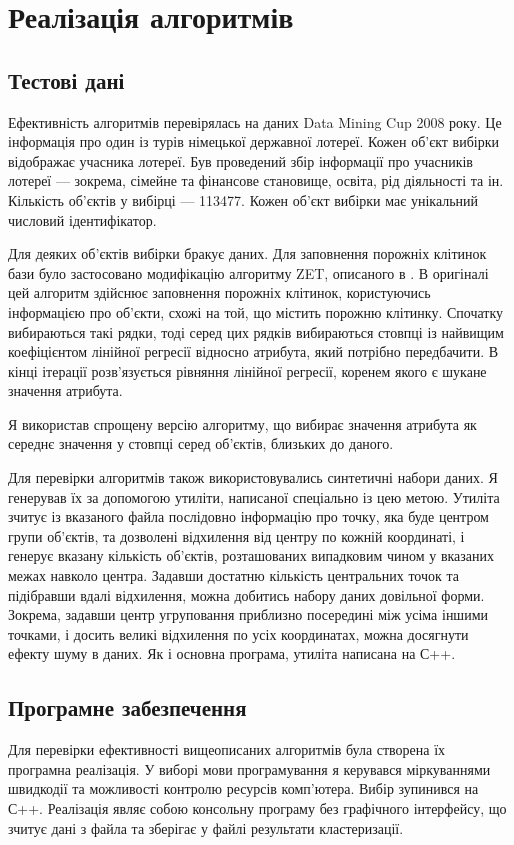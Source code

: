 \chapter{Реалізація алгоритмів}             
            
    \section {Тестові дані}
            Ефективність алгоритмів перевірялась на даних Data Mining Cup 2008 року. Це інформація про один із турів німецької державної лотереї. Кожен об'єкт вибірки відображає учасника лотереї. Був проведений збір інформації про учасників лотереї --- зокрема, сімейне та фінансове становище, освіта, рід діяльності та ін. Кількість об'єктів у вибірці --- 113477. Кожен об'єкт вибірки має унікальний числовий ідентифікатор.
            
            Для деяких об'єктів вибірки бракує даних. Для заповнення порожніх клітинок бази було застосовано модифікацію алгоритму ZET, описаного в \cite{Zagorujko}. В оригіналі цей алгоритм здійснює заповнення порожніх клітинок, користуючись інформацією про об'єкти, схожі на той, що містить порожню клітинку. Спочатку вибираються такі рядки, тоді серед цих рядків вибираються стовпці із найвищим коефіцієнтом лінійної регресії відносно атрибута, який потрібно передбачити. В кінці ітерації розв'язується рівняння лінійної регресії, коренем якого є шукане значення атрибута.
            
            Я використав спрощену версію алгоритму, що вибирає значення атрибута як середнє значення у стовпці серед об'єктів, близьких до даного.
            
            Для перевірки алгоритмів також використовувались синтетичні набори даних. Я генерував їх за допомогою утиліти, написаної спеціально із цею метою. Утиліта зчитує із вказаного файла послідовно інформацію про точку, яка буде центром групи об'єктів, та дозволені відхилення від центру по кожній координаті, і генерує вказану кількість об'єктів, розташованих випадковим чином у вказаних межах навколо центра. Задавши достатню кількість центральних точок та підібравши вдалі відхилення, можна добитись набору даних довільної форми. Зокрема, задавши центр угруповання приблизно посередині між усіма іншими точками, і досить великі відхилення по усіх координатах, можна досягнути ефекту шуму в даних. Як і основна програма, утиліта написана на С++.
            
               
        \section {Програмне забезпечення}
            Для перевірки ефективності вищеописаних алгоритмів була створена їх програмна реалізація. У виборі мови програмування я керувався міркуваннями швидкодії та можливості контролю ресурсів комп'ютера. Вибір зупинився на С++. Реалізація являє собою консольну програму без графічного інтерфейсу, що зчитує дані з файла та зберігає у файлі результати кластеризації.
            
